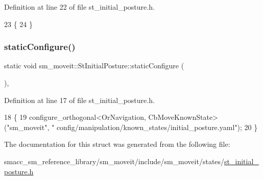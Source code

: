 Definition at line 22 of file st\+\_\+initial\+\_\+posture.\+h.


\begin{DoxyCode}
23     \{
24     \}
\end{DoxyCode}
\mbox{\label{structsm__moveit_1_1StInitialPosture_a54a2a80bf9a9b5d6838d727bc6ebff3f}} 
\subsubsection{\texorpdfstring{static\+Configure()}{staticConfigure()}}
{\footnotesize\ttfamily static void sm\+\_\+moveit\+::\+St\+Initial\+Posture\+::static\+Configure (\begin{DoxyParamCaption}{ }\end{DoxyParamCaption})\hspace{0.3cm}{\ttfamily [inline]}, {\ttfamily [static]}}



Definition at line 17 of file st\+\_\+initial\+\_\+posture.\+h.


\begin{DoxyCode}
18     \{
19         configure\_orthogonal<OrNavigation, CbMoveKnownState>(\textcolor{stringliteral}{"sm\_moveit"}, \textcolor{stringliteral}{"
      config/manipulation/known\_states/initial\_posture.yaml"});
20     \}
\end{DoxyCode}


The documentation for this struct was generated from the following file\+:\begin{DoxyCompactItemize}
\item 
smacc\+\_\+sm\+\_\+reference\+\_\+library/sm\+\_\+moveit/include/sm\+\_\+moveit/states/\hyperlink{include_2sm__moveit_2states_2st__initial__posture_8h}{st\+\_\+initial\+\_\+posture.\+h}\end{DoxyCompactItemize}
